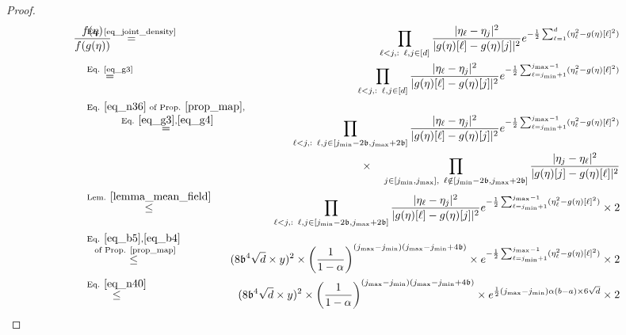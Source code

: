 \documentclass[11pt,letterpaper]{article}
\begin{document}
\begin{proof}
\begin{eqnarray}
  \frac{f(\eta)}{f(g(\eta))} 
 \!\!\! \!\!\!\!\!\!\!\!\!\!\!\! &\stackrel{\textrm{Eq. \eqref{eq_joint_density}}}{=} \!\!\! \!\!\!\!\!\! & \prod_{\ell<j,  :\, \, \, \ell,j \in [d]} \frac{| \eta_{\ell} - \eta_j|^2}{| g(\eta)[\ell] - g(\eta)[j]|^2} e^{-\frac{1}{2} \sum_{\ell=1}^{d}  (\eta_{\ell}^2 - g(\eta)[\ell]^2 )}\nonumber\nonumber\\
    &\stackrel{\textrm{Eq. \eqref{eq_g3}}}{=} & \prod_{\ell<j,  :\, \, \, \ell,j \in [d]} \frac{| \eta_{\ell} - \eta_j|^2}{| g(\eta)[\ell] - g(\eta)[j]|^2}  e^{-\frac{1}{2} \sum_{\ell=j_{\mathrm{min}}+1}^{j_{\mathrm{max}}-1}  (\eta_{\ell}^2 - g(\eta)[\ell]^2 )}\nonumber\nonumber\\
  &\stackrel{\textrm{Eq. } \eqref{eq_n36} \textrm{ of Prop. } \ref{prop_map}, }{\stackrel{\textrm{ Eq. } \eqref{eq_g3}, \eqref{eq_g4}}{=}} & \prod_{\ell<j,  :\, \, \, \ell,j \in [j_{\mathrm{min}} - 2 \mathfrak{b} , j_{\mathrm{max}} + 2 \mathfrak{b}]} \frac{| \eta_{\ell} - \eta_j|^2}{| g(\eta)[\ell] - g(\eta)[j]|^2} e^{-\frac{1}{2} \sum_{\ell=j_{\mathrm{min}}+1}^{j_{\mathrm{max}}-1}  (\eta_{\ell}^2 - g(\eta)[\ell]^2 )}\nonumber\\
&  & \times \quad  \prod_{j \in [j_{\mathrm{min}} , j_{\mathrm{max}}] , \, \, \, \ell \notin [j_{\mathrm{min}}  - 2 \mathfrak{b}  , j_{\mathrm{max}}  + 2 \mathfrak{b} ]} \frac{| \eta_{j} - \eta_\ell|^2}{| g(\eta)[j] - g(\eta)[\ell]|^2}\nonumber\\
%
  &\stackrel{\textrm{Lem. } \ref{lemma_mean_field}}{\leq} & \prod_{\ell<j,  :\, \, \, \ell,j \in [j_{\mathrm{min}} - 2 \mathfrak{b} , j_{\mathrm{max}} + 2 \mathfrak{b}]} \frac{| \eta_{\ell} - \eta_j|^2}{| g(\eta)[\ell] - g(\eta)[j]|^2} e^{-\frac{1}{2} \sum_{\ell=j_{\mathrm{min}}+1}^{j_{\mathrm{max}}-1}  (\eta_{\ell}^2 - g(\eta)[\ell]^2 )} \times 2\nonumber\\
 &\stackrel{\textrm{Eq. } \eqref{eq_b5},\eqref{eq_b4}  }{\stackrel{ \textrm{ of Prop. \ref{prop_map}}}{\leq}} &
\!\!\!\!\!\!\!\!\!\!\!\!\!\!   ( 8 \mathfrak{b}^4 \sqrt{d}  \times y)^2 \times \left(\frac{1}{1-\alpha}\right)^{(j_{\mathrm{max}} - j_{\mathrm{min}})(j_{\mathrm{max}} - j_{\mathrm{min}} +4 \mathfrak{b})} \times e^{-\frac{1}{2} \sum_{\ell=j_{\mathrm{min}}+1}^{j_{\mathrm{max}}-1}  (\eta_{\ell}^2 - g(\eta)[\ell]^2 )} \times 2 \nonumber\\
  &\stackrel{\textrm{Eq. } \eqref{eq_n40}}{\leq} & \!\!\!\!\!\!\!\!\!\!\!
  ( 8 \mathfrak{b}^4 \sqrt{d}  \times y)^2 \times \left(\frac{1}{1-\alpha}\right)^{(j_{\mathrm{max}} - j_{\mathrm{min}})(j_{\mathrm{max}} - j_{\mathrm{min}} +4 \mathfrak{b})} \times e^{\frac{1}{2}(j_{\mathrm{max}} - j_{\mathrm{min}})\alpha(b-a)\times 6\sqrt{d}} \times 2 \nonumber\\

\end{eqnarray}
\end{proof}
\end{document}
